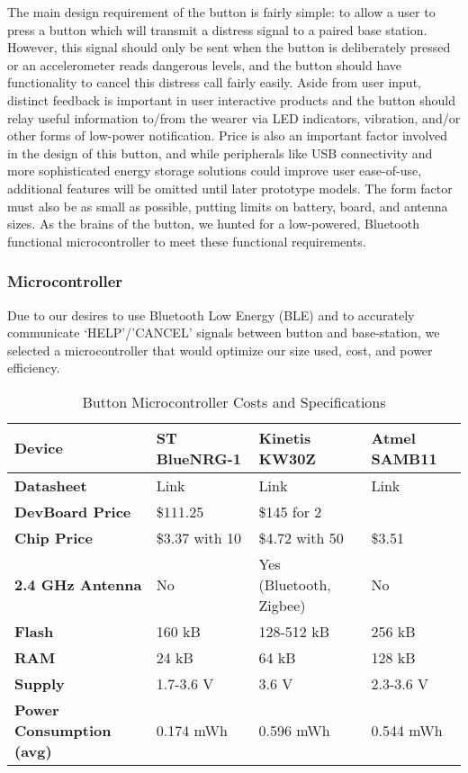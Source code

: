 \documentclass[journal,compsoc]{IEEEtran}
\begin{document}
The main design requirement of the button is fairly simple: to allow a user to press a button which will transmit a distress signal to a paired base station.  However, this signal should only be sent when the button is deliberately pressed or an accelerometer reads dangerous levels, and the button should have functionality to cancel this distress call fairly easily.  Aside from user input, distinct feedback is important in user interactive products and the button should relay useful information to/from the wearer via LED indicators, vibration, and/or other forms of low-power notification.  Price is also an important factor involved in the design of this button, and while peripherals like USB connectivity and more sophisticated energy storage solutions could improve user ease-of-use, additional features will be omitted until later prototype models.  The form factor must also be as small as possible, putting limits on battery, board, and antenna sizes.  As the brains of the button, we hunted for a low-powered, Bluetooth functional microcontroller to meet these functional requirements.\\

\subsubsection{Microcontroller}

Due to our desires to use Bluetooth Low Energy (BLE) and to accurately communicate ‘HELP’/’CANCEL’ signals between button and base-station, we selected a microcontroller that would optimize our size used, cost, and power efficiency.\\

\begin{table*}[t]
  \centering
  \begin{tabular}{>{\bfseries}l|l l l}
    Device & ST BlueNRG-1 & Kinetis KW30Z & Atmel SAMB11 \\
    \hline
    Datasheet & Link & Link & Link \\
    DevBoard Price & \$111.25 & \$145 for 2 & \\
    Chip Price & \$3.37 with 10 & \$4.72 with 50 & \$3.51 \\
    2.4 GHz Antenna & No & Yes (Bluetooth, Zigbee) & No \\
    Flash & 160 kB & 128-512 kB & 256 kB \\
    RAM & 24 kB & 64 kB & 128 kB \\
    Supply & 1.7-3.6 V & 3.6 V & 2.3-3.6 V \\
    Power Consumption (avg) & 0.174 mWh & 0.596 mWh & 0.544 mWh
  \end{tabular}
  \caption{Button Microcontroller Costs and Specifications}
\end{table*}
\end{document}
